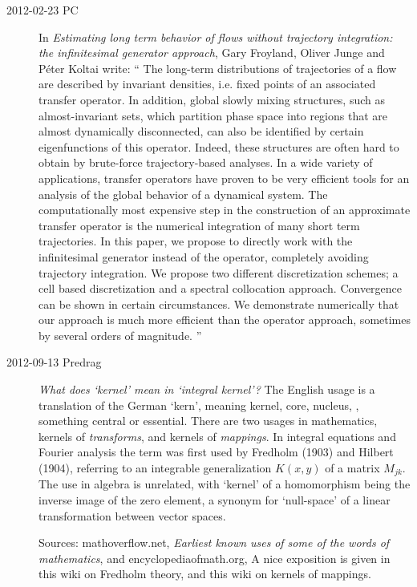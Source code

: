 \begin{description}

\item[2012-02-23 PC]
In \emph{Estimating long term behavior of flows without trajectory
integration: the infinitesimal generator approach}, 
Gary Froyland, Oliver Junge and P\'eter Koltai write:
``
The long-term distributions of trajectories of a flow are described by
invariant densities, i.e. fixed points of an associated transfer
operator. In addition, global slowly mixing structures, such as
almost-invariant sets, which partition phase space into regions that are
almost dynamically disconnected, can also be identified by certain
eigenfunctions of this operator. Indeed, these structures are often hard
to obtain by brute-force trajectory-based analyses. In a wide variety of
applications, transfer operators have proven to be very efficient tools
for an analysis of the global behavior of a dynamical system.
The computationally most expensive step in the construction of an
approximate transfer operator is the numerical integration of many short
term trajectories. In this paper, we propose to directly work with the
infinitesimal generator instead of the operator, completely avoiding
trajectory integration. We propose two different discretization schemes;
a cell based discretization and a spectral collocation approach.
Convergence can be shown in certain circumstances. We demonstrate
numerically that our approach is much more efficient than the operator
approach, sometimes by several orders of magnitude.
''

\item[2012-09-13 Predrag] \emph{What does `kernel' mean in `integral kernel'?}
The English usage is a translation of the German `kern', meaning kernel,
core, nucleus, \ie, something central or essential. There are two usages
in mathematics, kernels of \emph{transforms}, and kernels of
\emph{mappings}. In integral equations and Fourier analysis the term was
first used by Fredholm (1903) and Hilbert (1904), referring to an
integrable generalization $K(x,y)$ of a matrix $M_{jk}$. The use in
algebra is unrelated, with `kernel' of a homomorphism being the inverse
image of the zero element, a synonym for `null-space' of a linear
transformation between vector spaces.

Sources:
{mathoverflow.net},  {\emph{Earliest
known uses}} \emph{of some of the words of mathematics}, and
{encyclopediaofmath.org}, A nice exposition is given in this
 {wiki} on
Fredholm theory, and this
 {wiki} on
kernels of mappings.


\end{description}


